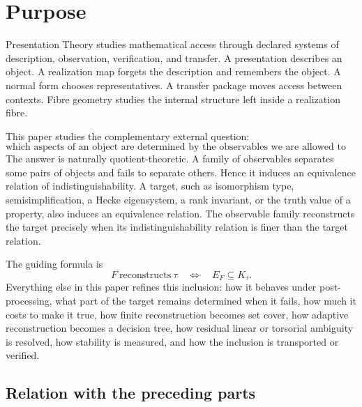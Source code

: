 \documentclass[11pt]{article}
\theoremstyle{definition}
\theoremstyle{remark}
\begin{document}
\begin{abstract}
The final sections explain how this observable calculus interfaces with the other parts of the theory and with recurring applications: rank invariants in multiparameter persistence, principal Hecke data and class-group twist ambiguity, and finite hom-count or Weisfeiler--Leman completions for graph classes.  These examples isolate the reusable quotient, residual, cost, and verification structure shared by many separating-family arguments.
\end{abstract}

\section{Purpose}

Presentation Theory studies mathematical access through declared systems of description, observation, verification, and transfer.  A presentation describes an object.  A realization map forgets the description and remembers the object.  A normal form chooses representatives.  A transfer package moves access between contexts.  Fibre geometry studies the internal structure left inside a realization fibre.

This paper studies the complementary external question:
\[
\text{which aspects of an object are determined by the observables we are allowed to read?}
\]
The answer is naturally quotient-theoretic.  A family of observables separates some pairs of objects and fails to separate others.  Hence it induces an equivalence relation of indistinguishability.  A target, such as isomorphism type, semisimplification, a Hecke eigensystem, a rank invariant, or the truth value of a property, also induces an equivalence relation.  The observable family reconstructs the target precisely when its indistinguishability relation is finer than the target relation.

The guiding formula is
\[
F\ \text{reconstructs}\ \tau
\quad\Longleftrightarrow\quad
E_F\subseteq K_\tau.
\]
Everything else in this paper refines this inclusion: how it behaves under post-processing, what part of the target remains determined when it fails, how much it costs to make it true, how finite reconstruction becomes set cover, how adaptive reconstruction becomes a decision tree, how residual linear or torsorial ambiguity is resolved, how stability is measured, and how the inclusion is transported or verified.

\subsection*{Relation with the preceding parts}
\end{document}

